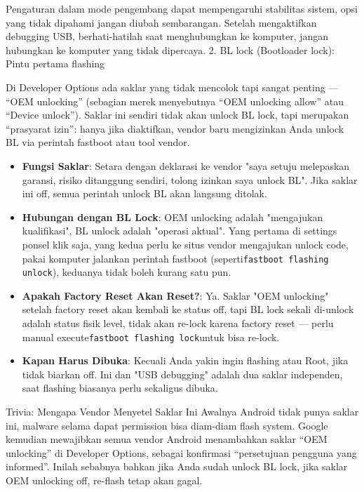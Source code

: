 \begin{tcbwarn}{Pengaturan dalam mode pengembang dapat mempengaruhi stabilitas sistem, opsi yang tidak dipahami jangan diubah sembarangan. Setelah mengaktifkan debugging USB, berhati-hatilah saat menghubungkan ke komputer, jangan hubungkan ke komputer yang tidak dipercaya.}
2. BL lock (Bootloader lock): Pintu pertama flashing

\end{tcbwarn}


Di Developer Options ada saklar yang tidak mencolok tapi sangat penting — “OEM unlocking” (sebagian merek menyebutnya “OEM unlocking allow” atau “Device unlock”). Saklar ini sendiri tidak akan unlock BL lock, tapi merupakan “prasyarat izin”: hanya jika diaktifkan, vendor baru mengizinkan Anda unlock BL via perintah fastboot atau tool vendor.

\begin{itemize}
  \item \textbf{Fungsi Saklar}: Setara dengan deklarasi ke vendor "saya setuju melepaskan garansi, risiko ditanggung sendiri, tolong izinkan saya unlock BL". Jika saklar ini off, semua perintah unlock BL akan langsung ditolak.
  \item \textbf{Hubungan dengan BL Lock}: OEM unlocking adalah "mengajukan kualifikasi", BL unlock adalah "operasi aktual". Yang pertama di settings ponsel klik saja, yang kedua perlu ke situs vendor mengajukan unlock code, pakai komputer jalankan perintah fastboot (seperti\texttt{fastboot flashing unlock}), keduanya tidak boleh kurang satu pun.
  \item \textbf{Apakah Factory Reset Akan Reset?}: Ya. Saklar "OEM unlocking" setelah factory reset akan kembali ke status off, tapi BL lock sekali di-unlock adalah status fisik level, tidak akan re-lock karena factory reset — perlu manual execute\texttt{fastboot flashing lock}untuk bisa re-lock.
  \item \textbf{Kapan Harus Dibuka}: Kecuali Anda yakin ingin flashing atau Root, jika tidak biarkan off. Ini dan "USB debugging" adalah dua saklar independen, saat flashing biasanya perlu sekaligus dibuka.
\end{itemize}

\begin{tcbinfo}{Trivia: Mengapa Vendor Menyetel Saklar Ini}
Awalnya Android tidak punya saklar ini, malware selama dapat permission bisa diam-diam flash system. Google kemudian mewajibkan semua vendor Android menambahkan saklar “OEM unlocking” di Developer Options, sebagai konfirmasi “persetujuan pengguna yang informed”. Inilah sebabnya bahkan jika Anda sudah unlock BL lock, jika saklar OEM unlocking off, re-flash tetap akan gagal.

\end{tcbinfo}

